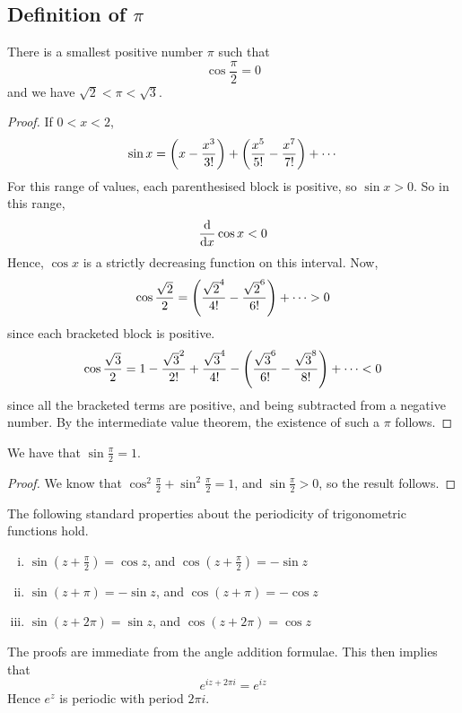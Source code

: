 \documentclass{article}
\begin{document}
\subsection{Definition of $\pi$}
\begin{proposition}
    There is a smallest positive number $\pi$ such that
    \[ \cos \frac{\pi}{2} = 0 \]
    and we have $\sqrt{2} < \pi < \sqrt{3}$.
\end{proposition}
\begin{proof}
    If $0 < x < 2$,
    \[ \sin x = \qty(x - \frac{x^3}{3!}) + \qty(\frac{x^5}{5!} - \frac{x^7}{7!}) + \cdots \]
    For this range of values, each parenthesised block is positive, so $\sin x > 0$. So in this range,
    \[ \dv{x} \cos x < 0 \]
    Hence, $\cos x$ is a strictly decreasing function on this interval. Now,
    \[ \cos \frac{\sqrt{2}}{2} = \qty(\frac{\sqrt{2}^4}{4!} - \frac{\sqrt{2}^6}{6!}) + \cdots > 0 \]
    since each bracketed block is positive.
    \[ \cos \frac{\sqrt{3}}{2} = 1 - \frac{\sqrt{3}^2}{2!} + \frac{\sqrt{3}^4}{4!} - \qty(\frac{\sqrt{3}^6}{6!} - \frac{\sqrt{3}^8}{8!}) + \cdots < 0 \]
    since all the bracketed terms are positive, and being subtracted from a negative number. By the intermediate value theorem, the existence of such a $\pi$ follows.
\end{proof}
\begin{corollary}
    We have that $\sin \frac{\pi}{2} = 1$.
\end{corollary}
\begin{proof}
    We know that $\cos^2 \frac{\pi}{2} + \sin^2 \frac{\pi}{2} = 1$, and $\sin \frac{\pi}{2} > 0$, so the result follows.
\end{proof}
\begin{theorem}
    The following standard properties about the periodicity of trigonometric functions hold.
    \begin{enumerate}[(i)]
        \item $\sin(z + \frac{\pi}{2}) = \cos z$, and $\cos(z + \frac{\pi}{2}) = -\sin z$
        \item $\sin(z + \pi) = -\sin z$, and $\cos(z + \pi) = -\cos z$
        \item $\sin(z + 2 \pi) = \sin z$, and $\cos(z + 2\pi) = \cos z$
    \end{enumerate}
\end{theorem}
\noindent The proofs are immediate from the angle addition formulae. This then implies that
\[ e^{iz + 2\pi i} = e^{iz} \]
Hence $e^{z}$ is periodic with period $2 \pi i$.
\end{document}
